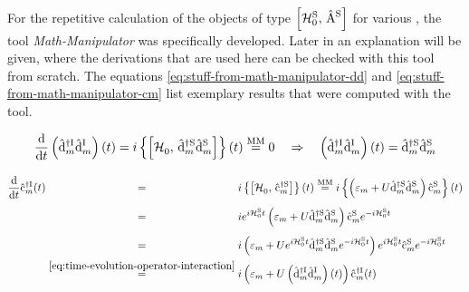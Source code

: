 For the repetitive calculation of the objects of type $\left[\HzeroHamiltonian[\schroedingerPicture],\, \Aop[\schroedingerPicture]\right]$ for various \Aop[\schroedingerPicture], the tool \emph{Math-Manipulator} was specifically developed. 
Later in  an explanation will be given, where the derivations that are used here can be checked with this tool from scratch.
The equations \ref{eq:stuff-from-math-manipulator-dd} and \ref{eq:stuff-from-math-manipulator-cm} list exemplary results that were computed with the tool.

\begin{equation}
    \label{eq:stuff-from-math-manipulator-dd}
    \difft{}\left(\dop[\interactionPicture]{m}{\dagger}\dop[\interactionPicture]{m}{}\right)(t)
    = i \left\{\left[\HzeroHamiltonian[],\,\dop[\schroedingerPicture]{m}{\dagger}\dop[\schroedingerPicture]{m}{}\right]\right\}(t) \stackrel{\text{MM}}{=} 0 \quad \Rightarrow \quad \left(\dop[\interactionPicture]{m}{\dagger}\dop[\interactionPicture]{m}{}\right)(t) = \dop[\schroedingerPicture]{m}{\dagger}\dop[\schroedingerPicture]{m}{}
\end{equation}

\begin{equation}
    \label{eq:stuff-from-math-manipulator-cm}
    \begin{split}
        \difft{}\copOfT[\interactionPicture]{m}{\dagger}
        &\stackrel{\phantom{\ref{eq:time-evolution-operator-interaction}}}{=} i \left\{\left[\HzeroHamiltonian[]{},\,\cop[\schroedingerPicture]{m}{\dagger}\right]\right\}(t) \stackrel{\text{MM}}{=} 
        i \left\{ \left(\epsl[m] + U \dop[\schroedingerPicture]{m}{\dagger}\dop[\schroedingerPicture]{m}{}\right)\cop[\schroedingerPicture]{m}{}\right\}(t)\\
        &\stackrel{\phantom{\ref{eq:time-evolution-operator-interaction}}}{=}i e^{i \HzeroHamiltonian[\schroedingerPicture]{} t} \left(\epsl[m] + U \dop[\schroedingerPicture]{m}{\dagger}\dop[\schroedingerPicture]{m}{}\right)\cop[\schroedingerPicture]{m}{}e^{-i \HzeroHamiltonian[\schroedingerPicture]{} t}\\
        &\stackrel{\phantom{\ref{eq:time-evolution-operator-interaction}}}{=}i \left(\epsl[m] + U e^{i \HzeroHamiltonian[\schroedingerPicture]{} t}\dop[\schroedingerPicture]{m}{\dagger}\dop[\schroedingerPicture]{m}{}e^{-i \HzeroHamiltonian[\schroedingerPicture]{} t}\right)e^{i \HzeroHamiltonian[\schroedingerPicture]{} t}\cop[\schroedingerPicture]{m}{}e^{-i \HzeroHamiltonian[\schroedingerPicture]{} t}\\
        &\stackrel{\ref{eq:time-evolution-operator-interaction}}{=}
        i \left(\epsl[m] + U \left(\dop[\interactionPicture]{m}{\dagger}\dop[\interactionPicture]{m}{}\right)(t)\right) \copOfT[\interactionPicture]{m}{\dagger}\\
    \end{split}
\end{equation}


